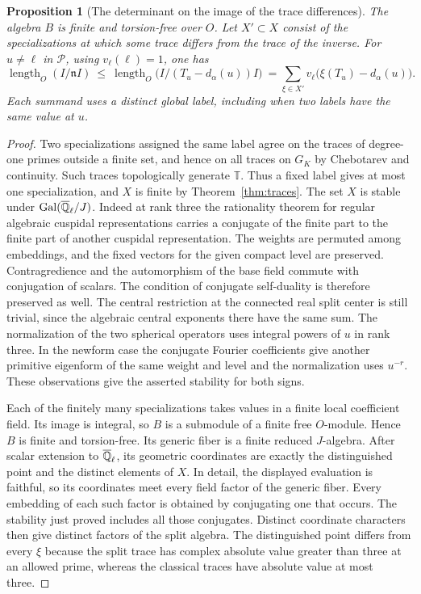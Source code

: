 \documentclass[a4paper,11pt]{article}
\newtheorem{proposition}{Proposition}[section]
\theoremstyle{definition}
\theoremstyle{remark}
\newcommand{\len}{\operatorname{length}}\newcommand{\Res}{\operatorname*{Res}}
\numberwithin{equation}{section}
\begin{document}
\begin{proposition}[The determinant on the image of the trace differences]
\label{prop:traceorder360}
The algebra \(B\) is finite and torsion-free over \(O\). Let
\(X'\subset X\) consist of the specializations at which some
trace differs from the trace of the inverse. For \(u\ne\ell\)
in \(\mathcal P\), using \(v_\ell(\ell)=1\), one has
\[
 \len_O(I/\mathfrak n I)
 \ \le\ \len_O\bigl(I/(T_u-d_\alpha(u))I\bigr)
 \ =\sum_{\xi\in X'} v_\ell\bigl(\xi(T_u)-d_\alpha(u)\bigr).
\]
Each summand uses a distinct global label, including when two
labels have the same value at \(u\).
\end{proposition}
\begin{proof}
Two specializations assigned the same label agree on the
traces of degree-one primes outside a finite set, and hence on
all traces on \(G_K\) by Chebotarev and continuity. Such traces
topologically generate \(\mathbb T\). Thus a fixed label gives
at most one specialization, and \(X\) is finite by
Theorem~\ref{thm:traces}. The set \(X\) is stable under
\(\operatorname{Gal}(\overline{\mathbb Q}_\ell/J)\). Indeed at rank
three the rationality theorem for regular algebraic cuspidal
representations carries a conjugate of the finite part to the
finite part of another cuspidal representation. The weights
are permuted among embeddings, and the fixed vectors for the
given compact level are preserved. Contragredience and the
automorphism of the base field commute with conjugation of
scalars. The condition of conjugate self-duality is therefore
preserved as well. The central restriction at the connected
real split center is still trivial, since the algebraic
central exponents there have the same sum. The normalization
of the two spherical operators uses integral powers of \(u\)
in rank three. In the newform case the conjugate Fourier
coefficients give another primitive eigenform of the same
weight and level and the normalization uses \(u^{-r}\).
These observations give the asserted stability for both
signs.~\cite{VII-V-clozel360,VII-V-V-newforms}

Each of the finitely many specializations takes values in a
finite local coefficient field. Its image is integral, so
\(B\) is a submodule of a finite free \(O\)-module. Hence
\(B\) is finite and torsion-free. Its generic fiber is a
finite reduced \(J\)-algebra. After scalar extension to
\(\overline{\mathbb Q}_\ell\), its geometric coordinates are exactly
the distinguished point and the distinct elements of \(X\).
In detail, the displayed evaluation is faithful, so its
coordinates meet every field factor of the generic fiber.
Every embedding of each such factor is obtained by conjugating
one that occurs. The stability just proved includes all those
conjugates. Distinct coordinate characters then give distinct
factors of the split algebra. The distinguished point differs
from every \(\xi\) because the split trace has complex absolute
value greater than three at an allowed prime, whereas the
classical traces have absolute value at most three.


\end{proof}
\end{document}
